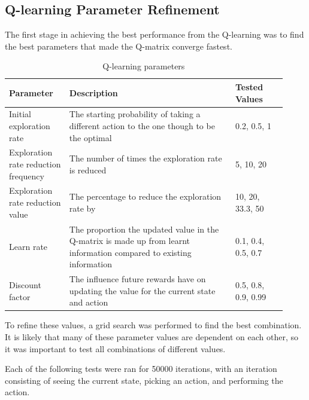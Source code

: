 \documentclass[12pt,a4paper]{article}
\begin{document}
\subsection{Q-learning Parameter Refinement}
The first stage in achieving the best performance from the Q-learning was to find the best parameters that made the Q-matrix converge fastest.
\begin{table}[htb]
\centering
\caption{Q-learning parameters}
\vspace*{6pt}
\label{q_params}
\begin{tabular}{>{\raggedright}p{0.2\linewidth}p{0.55\linewidth}p{0.17\linewidth}}\hline
Parameter & Description& Tested Values\\ \hline\hline
Initial exploration rate & The starting probability of taking a different action to the one though to be the optimal & 0.2, 0.5, 1\\ \hline
Exploration rate reduction frequency & The number of times the exploration rate is reduced & 5, 10, 20\\ \hline
Exploration rate reduction value & The percentage to reduce the exploration rate by & 10, 20, 33.3, 50 \\\hline
Learn rate & The proportion the updated value in the Q-matrix is made up from learnt information compared to existing information & 0.1, 0.4, 0.5,  0.7 \\\hline
Discount factor & The influence future rewards have on updating the value for the current state and action & 0.5, 0.8, 0.9, 0.99 \\\hline
\end{tabular}
\end{table}
To refine these values, a grid search was performed to find the best combination. It is likely that many of these parameter values are dependent on each other, so it was important to test all combinations of different values.

Each of the following tests were ran for 50000 iterations, with an iteration consisting of seeing the current state, picking an action, and performing the action.
\end{document}
